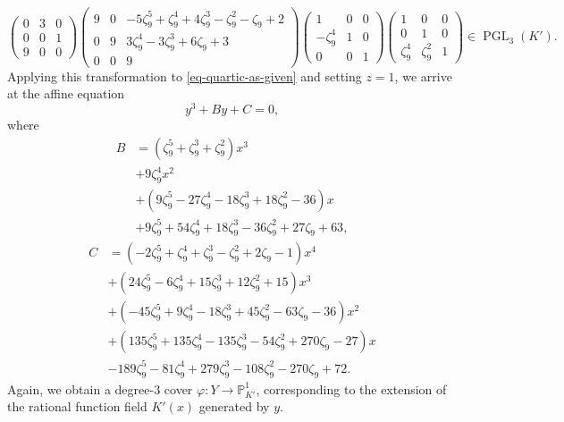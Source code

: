 \documentclass[11pt]{amsart}
\DeclareMathOperator{\PGL}{PGL}
\renewcommand{\phi}{\varphi}
\newcommand{\BP}{{\mathbb{P}}}
\theoremstyle{definition}
\begin{document}
\begin{equation*}
\begin{pmatrix}
0&3&0\\0&0&1\\9&0&0
\end{pmatrix}\begin{pmatrix}
9&0&-5\zeta_9^5 + \zeta_9^4 + 4\zeta_9^3 - \zeta_9^2 - \zeta_9 + 2\\0&9&3\zeta_9^4-3\zeta_9^3+6\zeta_9+3\\0&0&9
\end{pmatrix}\begin{pmatrix}
1&0&0\\-\zeta_9^4&1&0\\0&0&1
\end{pmatrix}\begin{pmatrix}1&0&0\\0&1&0\\\zeta_9^4&\zeta_9^2&1\end{pmatrix}\in\PGL_3(K').
\end{equation*}
Applying this transformation to \eqref{eq-quartic-as-given} and setting $z=1$, we arrive at the affine equation
\begin{equation}\label{eq-simpleform}
y^3+By+C=0,
\end{equation}
where
\begin{equation*}
\begin{aligned}
B&=(\zeta_9^5 + \zeta_9^3 + \zeta_9^2)x^3\\ &+ 9\zeta_9^4x^2\\ &+ (9\zeta_9^5 - 27\zeta_9^4 - 18\zeta_9^3 + 18\zeta_9^2 - 36)x\\ &+ 9\zeta_9^5 + 54\zeta_9^4 + 18\zeta_9^3 - 36\zeta_9^2 + 27\zeta_9 + 63,
\end{aligned}
\end{equation*}
\begin{equation*}
\begin{aligned}
C&=(-2\zeta_9^5 + \zeta_9^4 + \zeta_9^3 - \zeta_9^2 + 2\zeta_9 - 1)x^4\\ &+ (24\zeta_9^5 - 6\zeta_9^4 + 15\zeta_9^3 + 12\zeta_9^2 + 15)x^3\\ &+ (-45\zeta_9^5 + 9\zeta_9^4 - 18\zeta_9^3 + 45\zeta_9^2 - 63\zeta_9 - 36)x^2\\ &+ (135\zeta_9^5 + 135\zeta_9^4 - 135\zeta_9^3 - 54\zeta_9^2 + 270\zeta_9 - 27)x\\ &- 189\zeta_9^5 - 81\zeta_9^4 + 279\zeta_9^3 - 108\zeta_9^2 - 270\zeta_9 + 72.
\end{aligned}
\end{equation*}
Again, we obtain a degree-$3$ cover $\phi\colon Y\to\BP^1_{K'}$, corresponding to the extension of the rational function field $K'(x)$ generated by $y$.
\end{document}
